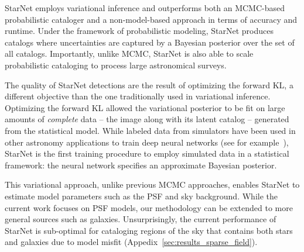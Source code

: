 StarNet employs variational inference and outperforms both an MCMC-based probabilistic cataloger and a non-model-based approach in terms of accuracy and runtime. 
Under the framework of probabilistic modeling, 
StarNet produces catalogs where uncertainties are captured by a Bayesian posterior over the set of all catalogs.
Importantly, unlike MCMC, StarNet is also able to scale probabilistic cataloging to process large astronomical surveys. 

The quality of StarNet detections are the result of optimizing the forward KL, a different objective than the one traditionally used in variational inference. 
Optimizing the forward KL allowed the variational posterior to be fit on large amounts of {\itshape complete} data -- the image along with its latent catalog -- generated from the statistical model. 
While labeled data from simulators have been used in other astronomy applications to train deep neural networks (see for example~\cite{Lanusse_2017_cmudeeplens, huang2019finding}), StarNet is the first training procedure to employ simulated data in a statistical framework: the neural network specifies an approximate Bayesian posterior. 


This variational approach, unlike previous MCMC approaches, enables StarNet to estimate model parameters such as the PSF and sky background.
While the current work focuses on PSF models, our methodology can be extended to more general sources such as galaxies. 
Unsurprisingly, the current performance of StarNet is sub-optimal for cataloging regions of the sky that contains both stars and galaxies due to model misfit (Appedix~\ref{sec:results_sparse_field}).  


